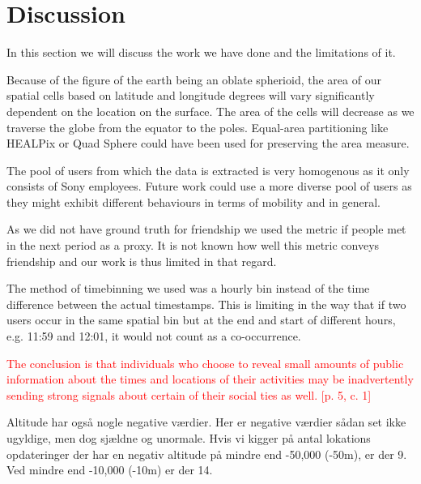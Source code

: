 \chapter{Discussion}
In this section we will discuss the work we have done and the limitations of it.

Because of the figure of the earth being an oblate spherioid, the area of our spatial cells based on latitude and longitude degrees will vary significantly dependent on the location on the surface. The area of the cells will decrease as we traverse the globe from the equator to the poles. Equal-area partitioning like HEALPix or Quad Sphere could have been used for preserving the area measure.

The pool of users from which the data is extracted is very homogenous as it only consists of Sony employees. Future work could use a more diverse pool of users as they might exhibit different behaviours in terms of mobility and in general.

As we did not have ground truth for friendship we used the metric if people met in the next period as a proxy. It is not known how well this metric conveys friendship and our work is thus limited in that regard.

The method of timebinning we used was a hourly bin instead of the time difference between the actual timestamps. This is limiting in the way that if two users occur in the same spatial bin but at the end and start of different hours, e.g. 11:59 and 12:01, it would not count as a co-occurrence.

\textcolor{red}{The conclusion is that individuals who choose to reveal small amounts of public information about the times and locations of their activities may be inadvertently sending strong signals about certain of their social ties as well. [p. 5, c. 1]}


Altitude har også nogle negative værdier. Her er negative værdier sådan set ikke ugyldige, men dog sjældne og unormale. Hvis vi kigger på antal lokations opdateringer der har en negativ altitude på mindre end -50,000 (-50m), er der 9. Ved mindre end -10,000 (-10m) er der 14.
